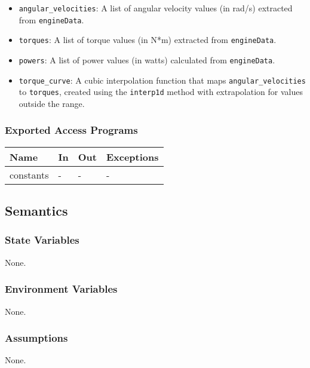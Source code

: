 \documentclass[12pt, titlepage]{article}
\begin{document}
\begin{itemize}
  \item \texttt{angular\_velocities}: A list of angular velocity values (in rad/s) extracted from \texttt{engineData}.
  \item \texttt{torques}: A list of torque values (in N*m) extracted from \texttt{engineData}.
  \item \texttt{powers}: A list of power values (in watts) calculated from \texttt{engineData}.
  \item \texttt{torque\_curve}: A cubic interpolation function that maps \texttt{angular\_velocities} to \texttt{torques}, created using the \texttt{interp1d} method with extrapolation for values outside the range.
  
\end{itemize}


\subsubsection{Exported Access Programs}

\begin{center}
\begin{tabular}{p{2cm} p{4cm} p{4cm} p{2cm}}
\hline
\textbf{Name} & \textbf{In} & \textbf{Out} & \textbf{Exceptions} \\
\hline
constants & - & - & - \\
\hline
\end{tabular}
\end{center}

\subsection{Semantics}

\subsubsection{State Variables}

None.

\subsubsection{Environment Variables}

None.

\subsubsection{Assumptions}

None.
\end{document}
